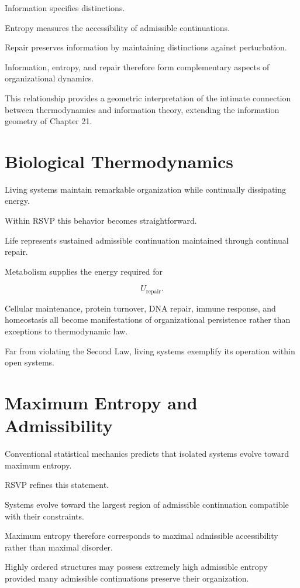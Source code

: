 \documentclass[11pt,oneside]{book}
\numberwithin{equation}{chapter}
\theoremstyle{definition}
\theoremstyle{plain}
\begin{document}
Information specifies distinctions.

Entropy measures the accessibility of admissible continuations.

Repair preserves information by maintaining distinctions against
perturbation.

Information, entropy, and repair therefore form complementary aspects of
organizational dynamics.

This relationship provides a geometric interpretation of the intimate
connection between thermodynamics and information theory, extending the
information geometry of Chapter 21.

\section{Biological Thermodynamics}

Living systems maintain remarkable organization while continually
dissipating energy.

Within RSVP this behavior becomes straightforward.

Life represents sustained admissible continuation maintained through
continual repair.

Metabolism supplies the energy required for

\[
U_{\mathrm{repair}}.
\]

Cellular maintenance, protein turnover, DNA repair, immune response, and
homeostasis all become manifestations of organizational persistence rather
than exceptions to thermodynamic law.

Far from violating the Second Law, living systems exemplify its operation
within open systems.

\section{Maximum Entropy and Admissibility}

Conventional statistical mechanics predicts that isolated systems evolve
toward maximum entropy.

RSVP refines this statement.

Systems evolve toward the largest region of admissible continuation
compatible with their constraints.

Maximum entropy therefore corresponds to maximal admissible accessibility
rather than maximal disorder.

Highly ordered structures may possess extremely high admissible entropy
provided many admissible continuations preserve their organization.
\end{document}
